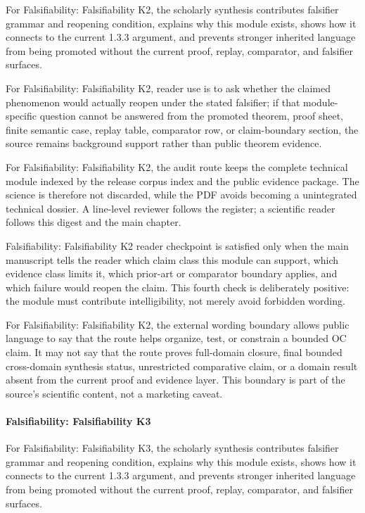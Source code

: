 For Falsifiability: Falsifiability K2, the scholarly synthesis contributes falsifier grammar and reopening condition, explains why this module exists, shows how it connects to the current 1.3.3 argument, and prevents stronger inherited language from being promoted without the current proof, replay, comparator, and falsifier surfaces.


For Falsifiability: Falsifiability K2, reader use is to ask whether the claimed phenomenon would actually reopen under the stated falsifier; if that module-specific question cannot be answered from the promoted theorem, proof sheet, finite semantic case, replay table, comparator row, or claim-boundary section, the source remains background support rather than public theorem evidence.


For Falsifiability: Falsifiability K2, the audit route keeps the complete technical module indexed by the release corpus index and the public evidence package. The science is therefore not discarded, while the PDF avoids becoming a unintegrated technical dossier. A line-level reviewer follows the register; a scientific reader follows this digest and the main chapter.


Falsifiability: Falsifiability K2 reader checkpoint is satisfied only when the main manuscript tells the reader which claim class this module can support, which evidence class limits it, which prior-art or comparator boundary applies, and which failure would reopen the claim. This fourth check is deliberately positive: the module must contribute intelligibility, not merely avoid forbidden wording.


For Falsifiability: Falsifiability K2, the external wording boundary allows public language to say that the route helps organize, test, or constrain a bounded OC claim. It may not say that the route proves full-domain closure, final bounded cross-domain synthesis status, unrestricted comparative claim, or a domain result absent from the current proof and evidence layer. This boundary is part of the source's scientific content, not a marketing caveat.


\paragraph{Falsifiability: Falsifiability K3}

For Falsifiability: Falsifiability K3, the scholarly synthesis contributes falsifier grammar and reopening condition, explains why this module exists, shows how it connects to the current 1.3.3 argument, and prevents stronger inherited language from being promoted without the current proof, replay, comparator, and falsifier surfaces.


